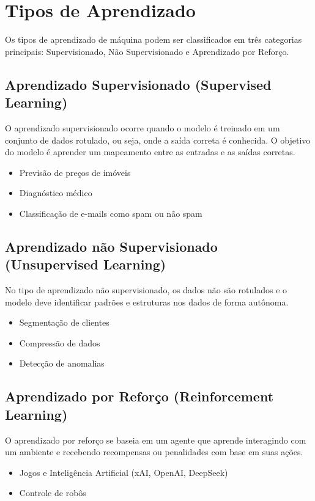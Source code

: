 \documentclass[a4paper,12pt,openany]{book}
\begin{document}
\section{Tipos de Aprendizado}
Os tipos de aprendizado de máquina podem ser classificados em três categorias principais: 
Supervisionado, Não Supervisionado e Aprendizado por Reforço.

\subsection{Aprendizado Supervisionado (Supervised Learning)}
O aprendizado supervisionado ocorre quando o modelo é treinado em um conjunto de dados rotulado, ou seja, onde a saída correta é 
conhecida. O objetivo do modelo é aprender um mapeamento entre as entradas e as saídas corretas.
    \begin{itemize}
        \item Previsão de preços de imóveis
        \item Diagnóstico médico
        \item Classificação de e-mails como spam ou não spam
    \end{itemize}


\subsection{Aprendizado não Supervisionado (Unsupervised Learning)}
No tipo de aprendizado não supervisionado, os dados não são rotulados e o modelo deve identificar padrões e estruturas nos dados de forma autônoma.
    \begin{itemize}
        \item Segmentação de clientes
        \item Compressão de dados
        \item Detecção de anomalias
    \end{itemize}

\subsection{Aprendizado por Reforço (Reinforcement Learning)}
O aprendizado por reforço se baseia em um agente que aprende interagindo com um ambiente e recebendo recompensas ou penalidades com base em suas ações.
\begin{itemize}
    \item Jogos e Inteligência Artificial (xAI, OpenAI, DeepSeek)
    \item Controle de robôs
\end{itemize}
\end{document}
